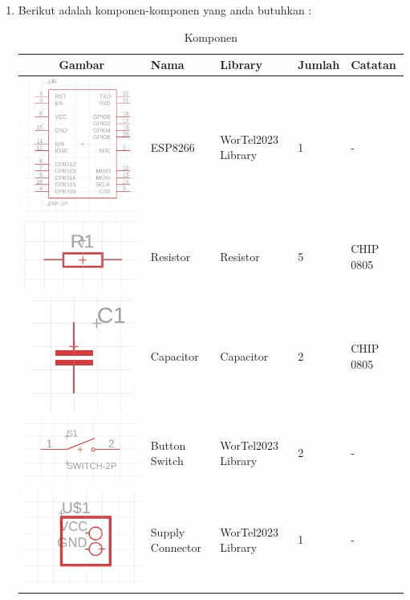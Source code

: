 \begin{enumerate}
\begin{figure}[H]
            
            \label{fig:Status Library}
        \end{figure}
    \item Berikut adalah komponen-komponen yang anda butuhkan :
    \vspace{5pt}
    \begin{table}[ht]
        
   
    \begin{center}
    
        \caption{Komponen}
        \label{tab:komponen}

        \begin{tabular}{|c|p{2cm}|m{2cm}|m{2cm}|m{2cm}|}
            \hline
            Gambar & Nama & Library & Jumlah & Catatan \\
            \hline
            \includegraphics[width=0.1\linewidth]{P1/img/komponen_esp.jpg} &  {\fontsize{10}{6}\selectfont ESP8266} &  {\fontsize{9}{6}\selectfont WorTel2023 Library} & 1 & - \\
            \hline
            \includegraphics[width=0.1\linewidth]{P1/img/komponen_resistor.jpg} & {\fontsize{10}{6}\selectfont Resistor} & {\fontsize{8}{6}\selectfont Resistor} & 5 &  {\fontsize{8}{6}\selectfont CHIP 0805} \\
            \hline
            \includegraphics[width=0.1\linewidth]{P1/img/komponen_capacitor.jpg} & {\fontsize{10}{6}\selectfont Capacitor} & {\fontsize{8}{6}\selectfont Capacitor} & 2 &  {\fontsize{8}{6}\selectfont CHIP 0805} \\
            \hline
            \includegraphics[width=0.1\linewidth]{P1/img/komponen_button_switch.jpg} & {\fontsize{8}{6}\selectfont Button Switch} &  {\fontsize{9}{6}\selectfont WorTel2023 Library} & 2 & - \\
            \hline
            \includegraphics[width=0.1\linewidth]{P1/img/komponen_supply_connector.jpg} & {\fontsize{8}{6}\selectfont Supply Connector} &  {\fontsize{9}{6}\selectfont WorTel2023 Library} & 1 & - \\

\end{tabular}
\end{center}
\end{table}
\end{enumerate}

